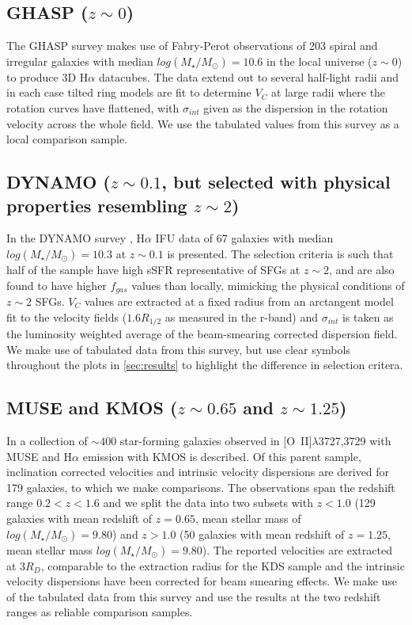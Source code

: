 \documentclass[fleqn,usenatbib]{mn2e}
\begin{document}
\subsection{GHASP ($z\sim0$)}\label{subsec:GHASP}
The GHASP survey \citep[E08]{Epinat2008,Epinat2008a} makes use of Fabry-Perot observations of 203 spiral and irregular galaxies with median $log(M_{\star}/M_{\odot})=10.6$ in the local universe ($z\sim0$) to produce 3D H$\alpha$ datacubes.
The data extend out to several half-light radii and in each case tilted ring models are fit to determine $V_{C}$ at large radii where the rotation curves have flattened, with $\sigma_{int}$ given as the dispersion in the rotation velocity across the whole field.
We use the tabulated values from this survey as a local comparison sample.

\subsection{DYNAMO ($z\sim0.1$, but selected with physical properties resembling $z\sim2$)}\label{subsec:DYNAMO}
In the DYNAMO survey \citep[G14]{Green2014}, H$\alpha$ IFU data of 67 galaxies with median $log(M_{\star}/M_{\odot})=10.3$ at $z\sim0.1$ is presented.
The selection criteria is such that half of the sample have high sSFR representative of SFGs at $z\sim 2$, and are also found to have higher $f_{gas}$ values than locally, mimicking the physical conditions of $z\sim 2$ SFGs.
$V_{C}$ values are extracted at a fixed radius from an arctangent model fit to the velocity fields ($1.6R_{1/2}$ as measured in the r-band) and $\sigma_{int}$ is taken as the luminosity weighted average of the beam-smearing corrected dispersion field.
We make use of tabulated data from this survey, but use clear symbols throughout the plots in \cref{sec:results} to highlight the difference in selection critera.

\subsection{MUSE and KMOS ($z\sim0.65$ and $z\sim1.25$)}\label{subsec:MUSE_and_KMOS}
In \cite{Swinbank2017} a collection of $\sim400$ star-forming galaxies observed in [O~{\sc II}]$\lambda$3727,3729 with MUSE and H$\alpha$ emission with KMOS is described.
Of this parent sample, inclination corrected velocities and intrinsic velocity dispersions are derived for 179 galaxies, to which we make comparisons.
The observations span the redshift range $0.2 < z < 1.6$ and we split the data into two subsets with $z < 1.0$ (129 galaxies with mean redshift of $z = 0.65$, mean stellar mass of $log(M_{\star}/M_{\odot})=9.80$) and $z > 1.0$ (50 galaxies with mean redshift of $z = 1.25$, mean stellar mass $log(M_{\star}/M_{\odot})=9.80$).
The reported velocities are extracted at $3R_{D}$, comparable to the extraction radius for the KDS sample and the intrinsic velocity dispersions have been corrected for beam smearing effects.
We make use of the tabulated data from this survey and use the results at the two redshift ranges as reliable comparison samples.
\end{document}
